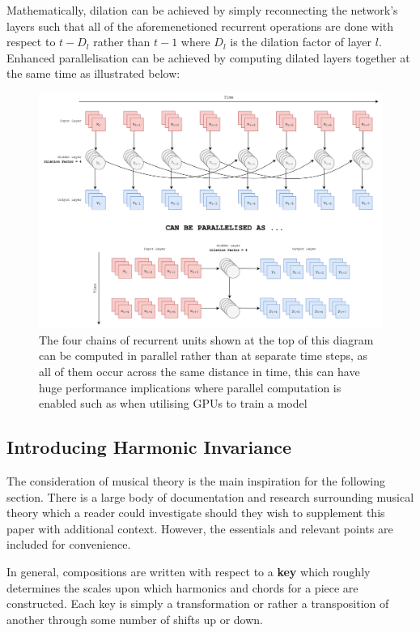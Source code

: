\documentclass[12pt,]{article}
\begin{document}
Mathematically, dilation can be achieved by simply reconnecting the
network's layers such that all of the aforemenetioned recurrent
operations are done with respect to \(t-D_l\) rather than \(t-1\) where
\(D_l\) is the dilation factor of layer \(l\). Enhanced parallelisation
can be achieved by computing dilated layers together at the same time as
illustrated below:

\begin{figure}
\centering
\includegraphics{Images/dilatedrnnparallel.png}
\caption{The four chains of recurrent units shown at the top of this
diagram can be computed in parallel rather than at separate time steps,
as all of them occur across the same distance in time, this can have
huge performance implications where parallel computation is enabled such
as when utilising GPUs to train a model}
\end{figure}

\hypertarget{introducing-harmonic-invariance}{%
\subsection{Introducing Harmonic
Invariance}\label{introducing-harmonic-invariance}}

The consideration of musical theory is the main inspiration for the
following section. There is a large body of documentation and research
surrounding musical theory which a reader could investigate should they
wish to supplement this paper with additional context. However, the
essentials and relevant points are included for convenience.

In general, compositions are written with respect to a \textbf{key}
which roughly determines the scales upon which harmonics and chords for
a piece are constructed. Each key is simply a transformation or rather a
transposition of another through some number of shifts up or down.
\end{document}
